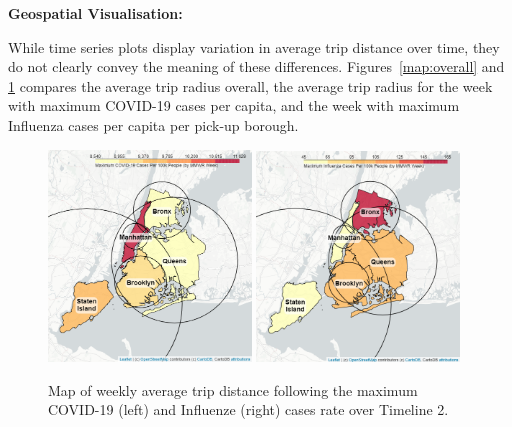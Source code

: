 \documentclass[11pt]{article}
\begin{document}



\textbf{Geospatial Visualisation:}    

While time series plots display variation in average trip distance over time, 
they do not clearly convey the meaning of these differences.
Figures~\ref{map:overall} and \ref{maps} compares the average trip radius overall, 
the average trip radius for the week with maximum COVID-19 cases per capita, 
and the week with maximum Influenza cases per capita per pick-up borough.



\begin{figure}[H]

    \centering

    \includegraphics[width=0.48\textwidth]{../plots/cropped-map-avg-trip-distance-at-max-covid-by-pu_borough.png}
    \includegraphics[width=0.48\textwidth]{../plots/cropped-map-avg-trip-distance-at-max-flu-by-pu_borough.png}

    \caption{Map of weekly average trip distance following the maximum COVID-19 (left) and Influenze (right) cases rate over Timeline 2.} %
    \label{maps}
\end{figure}
\end{document}
